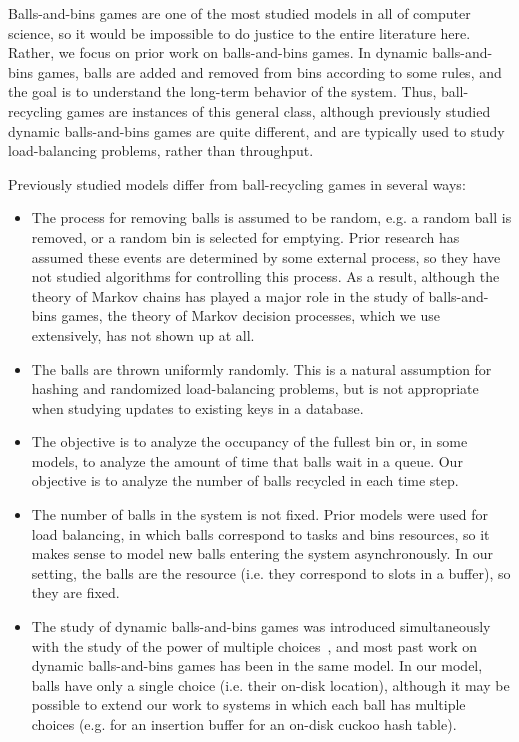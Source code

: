 

Balls-and-bins games are one of the most studied models in all of computer
science, so it would be impossible to do justice to the entire literature here.
Rather, we focus on prior work on  balls-and-bins games.  In
dynamic balls-and-bins games, balls are added and removed from bins according
to some rules, and the goal is to understand the long-term behavior of the
system.  Thus, ball-recycling games are instances of this general class,
although previously studied dynamic balls-and-bins games are quite different,
and are typically used to study load-balancing problems, rather than
throughput.

Previously studied models differ from ball-recycling games in several
ways: 
\begin{itemize}
\item The process for removing balls is assumed to be random, e.g. a
  random ball is removed, or a random bin is selected for emptying.
  Prior research has assumed these events are determined by some
  external process, so they have not studied algorithms for
  controlling this process.  As a result, although the theory of
  Markov chains has played a major role in the study of balls-and-bins
  games, the theory of Markov decision processes, which we use
  extensively, has not shown up at all.
\item The balls are thrown uniformly randomly.  This is a natural
  assumption for hashing and randomized load-balancing problems, but
  is not appropriate when studying updates to existing keys in a
  database.
\item The objective is to analyze the occupancy of the fullest bin or,
  in some models, to analyze the amount of time that balls wait in a
  queue.  Our objective is to analyze the number of balls recycled in
  each time step.
\item The number of balls in the system is not fixed.  Prior models
  were used for load balancing, in which balls correspond to tasks and
  bins resources, so it makes sense to model new balls entering the
  system asynchronously.  In our setting, the balls are the
  resource (i.e. they correspond to slots in a buffer), so
  they are fixed.
\item The study of dynamic balls-and-bins games was introduced
  simultaneously with the study of the power of multiple
  choices~\cite{AzarBrKa94}, and most past work on dynamic
  balls-and-bins games has been in the same model.  In our model,
  balls have only a single choice (i.e. their on-disk location),
  although it may be possible to extend our work to systems in which
  each ball has multiple choices (e.g. for an insertion buffer for an
  on-disk cuckoo hash table).
\end{itemize}

